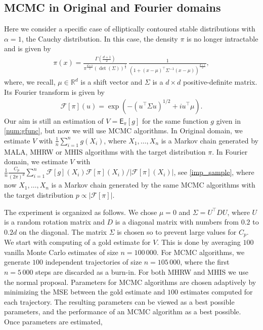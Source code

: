 \documentclass[preprint, 3p, authoryear]{elsarticle}
\newcommand{\E}{\mathsf{E}}
\newcommand{\R}{\mathbb R}
\newcommand{\T}{\top}
\theoremstyle{definition}
\begin{document}
\subsection{MCMC in Original and Fourier domains}
Here we consider a specific case of elliptically contoured stable distributions with $\alpha = 1$, the Cauchy distribution.
In this case, the density $\pi$ is no longer intractable and is given by
\begin{align*}
	\pi(x) = \frac{\Gamma(\frac{d+1}{2})}{\pi^{\frac{d+1}{2}}(\det(\Sigma))^{\frac{1}{2}}} \,
		\frac{1}{(1+(x-\mu)^{\T}\Sigma^{-1}(x-\mu))^{\frac{d+1}{2}}},
\end{align*}
where, we recall, $\mu\in\R^d$ is a shift vector and $\Sigma$ is a $d \times d$ positive-definite matrix.
Its Fourier transform is given by
\begin{align*}
	\mathcal{F}[\pi](u) =  \exp\left( - (u^{\T}\Sigma u)^{1/2} + i u^{\T}\mu \right).
\end{align*}
Our aim is still an estimation of $V=\E_\pi[g]$ for the same function $g$ given in \eqref{num:gfunc},
but now we will use MCMC algorithms. 
In Original domain, we estimate $V$ with $\frac{1}{n}\sum_{i=1}^n g(X_i)$, 
where $X_1,\ldots,X_n$ is a Markov chain generated by MALA, MHRW or MHIS algorithms with the target distribution $\pi$. 
In Fourier domain, we 
estimate $V$ with $\frac{1}{n}\frac{C_p}{(2\pi)^d}\sum_{i=1}^n \mathcal{F}[g](X_i)\mathcal{F}[\pi](X_i)/|\mathcal{F}[\pi](X_i)|$, see \eqref{imp_sample},
where now $X_1,\ldots,X_n$ is a Markov chain generated by the same MCMC algorithms with the target distribution $p\propto|\mathcal{F}[\pi]|$.
\par
The experiment is organized as follows. 
We chose $\mu=0$ and $\Sigma = U^\T D U$,
where $U$ is a random rotation matrix and $D$ is a diagonal matrix with numbers from $0.2$ to $0.2d$ on the diagonal. 
The matrix $\Sigma$ is chosen so to prevent large values for $C_{p}$.
We start with computing of a gold estimate for $V$.
This is done by averaging $100$ vanilla Monte Carlo estimates of size $n=100\,000$.
For MCMC algorithms, we generate $100$ independent trajectories of size $n=105\,000$,
where the first $n=5\,000$ steps are discarded as a burn-in. For both MHRW and MHIS we use the normal proposal.
Parameters for MCMC algorithms are chosen adaptively by minimizing the MSE between the gold estimate and
$100$ estimates computed for each trajectory. The resulting parameters can be viewed as a best possible
parameters, and the performance of an MCMC algorithm as a best possible. Once parameters are estimated, 
\end{document}
